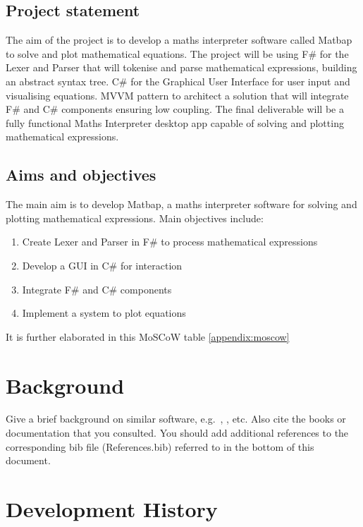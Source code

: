 \documentclass[a4paper, oneside, 11pt]{report}
\begin{document}
\section{Project statement}
The aim of the project is to develop a maths interpreter software called Matbap to solve and plot mathematical equations. The project will be using F\# for the Lexer and Parser that will tokenise and parse mathematical expressions, building an abstract syntax tree. C\# for the Graphical User Interface for user input and visualising equations. MVVM pattern to architect a solution that will integrate F\# and C\# components ensuring low coupling. The final deliverable will be a fully functional Maths Interpreter desktop app capable of solving and plotting mathematical expressions.

\section{Aims and objectives}
The main aim is to develop Matbap, a maths interpreter software for solving and plotting mathematical expressions. Main objectives include:
\begin{enumerate}
    \item Create Lexer and Parser in F\# to process mathematical expressions
    \item Develop a GUI in C\# for interaction
    \item Integrate F\# and C\# components
    \item Implement a system to plot equations
\end{enumerate}


It is further elaborated in this MoSCoW table \ref{appendix:moscow} 






\chapter{Background}

Give a brief background on similar software, e.g.\ \cite{Desmos:2023}, \cite{Matlab:2023}, etc.
Also cite the books \cite{Nystrom:2021} or documentation \cite{WPF:2023} that you consulted.
You should add additional references to the corresponding bib file (References.bib) referred to in the bottom of this document.


\chapter{Development History}\label{Chap:DevHist}
\end{document}
